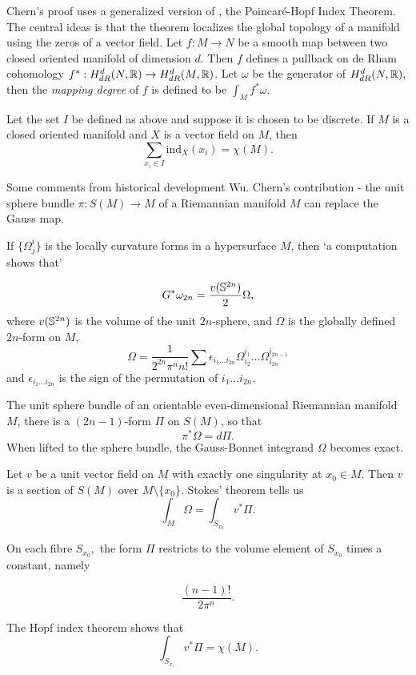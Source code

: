 Chern's proof uses a generalized version of , the Poincar\'e-Hopf Index Theorem.
The central ideas is that the theorem localizes the global topology of a manifold using the zeros of a vector field.
Let $f:M\rightarrow N$ be a smooth map between two closed oriented manifold of dimension $d$.
Then $f$ defines a pullback on de Rham cohomology $f^*:H_{dR}^d(N,\mathbb{R})\rightarrow H_{dR}^d(M,\mathbb{R})$.
Let $\omega$ be the generator of $H_{dR}^d(N,\mathbb{R}),$ then the \emph{mapping degree}
of $f$ is defined to be $\int_Mf^*\omega.$

\begin{theorem}\label{thm:gph}
Let the set $I$ be defined as above and suppose it is chosen to be discrete.
If $M$ is a closed oriented manifold and $X$ is a vector field on $M$, then
$$\sum_{x_i\in I} \text{ind}_X(x_i)=\chi(M).$$
\end{theorem}


Some comments from historical development Wu.
Chern's contribution - the unit sphere bundle $\pi: S(M)\rightarrow M$
of a Riemannian manifold $M$ can replace the Gauss map.

If $\{\Omega_j^i\}$ is the locally curvature forms in a hypersurface $M$,
then `a computation shows that'

$$G^*\omega_{2n}=\frac{v(\mathbb{S}^{2n})}{2}\Omega,$$
where $v(\mathbb{S}^{2n})$ is the volume of the unit $2n$-sphere, and $\Omega$
is the globally defined $2n$-form on $M$,
$$\Omega=\frac{1}{2^{2n}\pi^n n!}\sum \epsilon_{i_1\ldots i_{2n}}\Omega_{i_2}^{i_1}\ldots \Omega_{i_{2n}}^{i_{2n-1}}$$ 
and $\epsilon_{i_1\ldots i_{2n}}$ is the sign of the permutation
of $i_1\ldots i_{2n}$.


The unit sphere bundle of an orientable even-dimensional Riemannian manifold 
$M$, there is a $(2n-1)$-form $\Pi$ on $S(M)$,
so that 
$$\pi^*\Omega = d\Pi.$$
When lifted to the sphere bundle, the Gauss-Bonnet integrand $\Omega$ 
becomes exact.

Let $v$ be a unit vector field on $M$ with exactly one singularity at $x_0\in M.$
Then $v$ is a section of $S(M)$ over $M\setminus \{x_0\}.$
Stokes' theorem tells us
$$\int_M\Omega=\int_{S_{x_0}}v^*\Pi.$$

On each fibre $S_{x_0},$ the form $\Pi$ restricts to the volume element of $S_{x_0}$
times a constant, namely

$$\frac{(n-1)!}{2\pi^n}.$$

The Hopf index theorem shows that
$$\int_{S_{x_)}}v^*\Pi=\chi(M).$$ 


